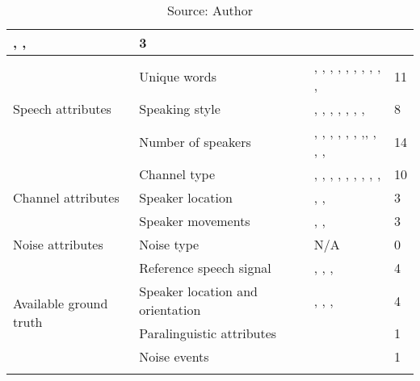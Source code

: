 \begin{landscape}
\begin{longtable}{|p{4cm}|p{5cm}|p{7cm}|p{3.5cm}|}
    \cite{almeman2018building}, \cite{moore2017sheffield}, \cite{liu2016sheffield} & 3
\\ \hline \multirow{3}{*}{Speech attributes}
    & Unique words & 
    \cite{bougrine2017altruistic}, \cite{bougrine2017altruistic}, \cite{ng2017shefce}, \cite{moore2017sheffield}, \cite{ramli2017first}, \cite{goldman2016siwis}, \cite{liu2016sheffield}, \cite{ruilan2016improving}, \cite{klessa2013paralingua}, \cite{nagino2008building}, \cite{clopper2006nationwide} & 11
    \\ \cline{2-4} & Speaking style &
    \cite{dwivedi2017documenting}, \cite{bougrine2017altruistic}, \cite{ng2017shefce}, \cite{moore2017sheffield}, \cite{ramli2017first}, \cite{goldman2016siwis}, \cite{nagino2008building}, \cite{clopper2006nationwide} & 8
    \\ \cline{2-4} & Number of speakers & 
    \cite{dwivedi2017documenting}, \cite{bougrine2017altruistic}, \cite{bougrine2017altruistic}, \cite{ng2017shefce}, \cite{moore2017sheffield}, \cite{ramli2017first}, \cite{goldman2016siwis},, \cite{ruilan2016improving} \cite{liu2016sheffield}, \cite{klessa2013paralingua}, \cite{nagino2008building}, \cite{clopper2006nationwide} & 14
\\ \hline \multirow{3}{*}{Channel attributes}
    & Channel type & 
    \cite{dwivedi2017documenting}, \cite{bougrine2017altruistic}, \cite{ng2017shefce}, \cite{moore2017sheffield}, \cite{ramli2017first}, \cite{goldman2016siwis}, \cite{liu2016sheffield}, \cite{ruilan2016improving}, \cite{nagino2008building}, \cite{clopper2006nationwide} & 10
    \\ \cline{2-4} & Speaker location & 
    \cite{dwivedi2017documenting}, \cite{ng2017shefce}, \cite{liu2016sheffield} & 3
    \\ \cline{2-4} & Speaker movements & 
    \cite{dwivedi2017documenting}, \cite{moore2017sheffield}, \cite{liu2016sheffield} & 3
\\ \hline \multirow{1}{*}{Noise attributes}
    & Noise type & N/A &
    0
\\ \hline \multirow{4}{*}{Available ground truth} 
    & Reference speech signal & 
    \cite{ng2017shefce}, \cite{moore2017sheffield}, \cite{ramli2017first}, \cite{liu2016sheffield} & 4
    \\ \cline{2-4} & Speaker location and orientation &
    \cite{bougrine2017altruistic}, \cite{moore2017sheffield}, \cite{ramli2017first}, \cite{liu2016sheffield} & 4
    \\ \cline{2-4} & Paralinguistic attributes &
    \cite{klessa2013paralingua} & 1 \\ \cline{2-4} & Noise events & 
    \cite{ramli2017first} & 1 \\ \hline
\caption*{Source: Author}
\end{longtable}
\end{landscape}

